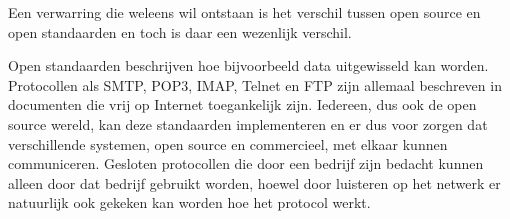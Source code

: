 Een verwarring die weleens wil ontstaan is het verschil tussen open source en open standaarden en toch is daar een
wezenlijk verschil.\par

Open standaarden beschrijven hoe bijvoorbeeld data uitgewisseld kan worden. Protocollen als SMTP, POP3, IMAP, Telnet en
FTP zijn allemaal beschreven in documenten die vrij op Internet toegankelijk zijn. Iedereen, dus ook de open source
wereld, kan deze standaarden implementeren en er dus voor zorgen dat verschillende systemen, open source en
commercieel, met elkaar kunnen communiceren. Gesloten protocollen die door een bedrijf zijn bedacht kunnen alleen door
dat bedrijf gebruikt worden, hoewel door luisteren op het netwerk er natuurlijk ook gekeken kan worden hoe het protocol
werkt.
